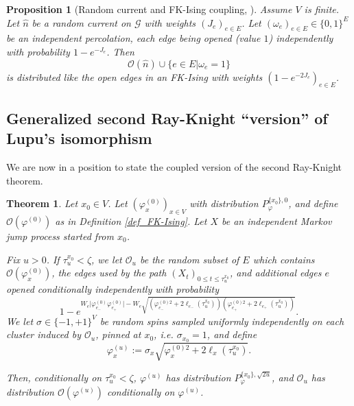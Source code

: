 \documentclass[11pt,a4paper]{amsart}
\numberwithin{equation}{section}
\newtheorem{theorem}{Theorem}
\newtheorem{proposition}{Proposition}[section]
\begin{document}
\begin{proposition}[Random current and FK-Ising coupling, 
\cite{lupu-werner}]
\label{RCFKIsing}
Assume $V$ is finite. Let $\hat{n}$ be a random current on $\mathcal{G}$ with weights
$(J_{e})_{e\in E}$. Let $(\omega_{e})_{e\in E}\in\lbrace 0,1\rbrace^{E}$ be an independent percolation, each edge being opened (value $1$) independently with probability 
$1-e^{-J_{e}}$. Then
\begin{displaymath}
\mathcal{O}(\hat{n})\cup\lbrace e\in E\vert \omega_{e}=1\rbrace
\end{displaymath}
is distributed like the open edges in an FK-Ising with weights 
$(1-e^{-2 J_{e}})_{e\in E}$.
\end{proposition}
 
\subsection{Generalized second Ray-Knight ``version'' of Lupu's isomorphism}\label{sec:glupu}
We are now in a position to state the coupled version of the second Ray-Knight theorem.
\begin{theorem}
\label{Lupu}
Let $x_{0}\in V$. Let $(\varphi_{x}^{(0)})_{x\in V}$ with distribution $P_{\varphi}^{\lbrace x_{0}\rbrace,0}$, and define $\mathcal{O}(\varphi^{(0)})$ as in Definition \ref{def_FK-Ising}. 
Let $X$ be an independent Markov jump process started from $x_{0}$. 

Fix $u>0$. If $\tau_{u}^{x_{0}}<\zeta$, we 
let $\mathcal{O}_{u}$ be the random subset of $E$ which contains $\mathcal{O}(\varphi_{x}^{(0)})$, the edges used by the path $(X_{t})_{0\leq t\leq \tau_{u}^{x_{0}}}$, and additional edges $e$ opened conditionally independently with probability
\begin{displaymath}
1-e^{W_{e}\vert\varphi_{e_{-}}^{(0)}\varphi_{e_{+}}^{(0)}\vert - 
W_{e}\sqrt{(\varphi_{e_{-}}^{(0)2}+2\ell_{e_{-}}(\tau_{u}^{x_{0}}))
(\varphi_{e_{+}}^{(0)2}+2\ell_{e_{+}}(\tau_{u}^{x_{0}}))}}.
\end{displaymath}
We let $\sigma\in\lbrace -1,+1\rbrace^{V}$ be random spins sampled uniformly independently on each cluster induced by
$\mathcal{O}_{u}$, pinned at $x_0$, i.e. $\sigma_{x_0}=1$, and define
\begin{displaymath}
\varphi_{x}^{(u)}:=\sigma_{x}\sqrt{\varphi_{x}^{(0)2}+2\ell_{x}(\tau_{u}^{x_{0}})}.
\end{displaymath}

Then, conditionally on $\tau_{u}^{x_{0}}<\zeta$, $\varphi^{(u)}$ has  distribution $P_{\varphi}^{\lbrace x_{0}\rbrace,\sqrt{2u}}$, and
$\mathcal{O}_{u}$ has distribution $\mathcal{O}(\varphi^{(u)})$ conditionally on $\varphi^{(u)}$.
\end{theorem}
\end{document}
